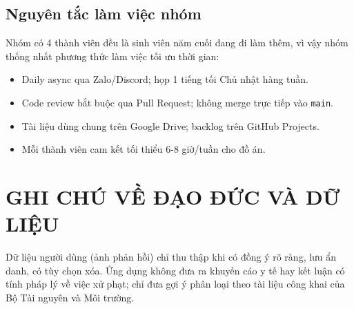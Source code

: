 \documentclass[13pt,a4paper,oneside]{report}
\newcommand{\centerchapter}{%
  \titleformat{\chapter}[hang]{\normalfont\Large\bfseries\centering}{}{0pt}{}%
}
\begin{document}
\section{Nguyên tắc làm việc nhóm}

Nhóm có 4 thành viên đều là sinh viên năm cuối đang đi làm thêm, vì vậy nhóm thống nhất phương thức làm việc tối ưu thời gian:

\begin{itemize}[leftmargin=1.5cm]
    \item Daily async qua Zalo/Discord; họp 1 tiếng tối Chủ nhật hàng tuần.
    \item Code review bắt buộc qua Pull Request; không merge trực tiếp vào \texttt{main}.
    \item Tài liệu dùng chung trên Google Drive; backlog trên GitHub Projects.
    \item Mỗi thành viên cam kết tối thiểu 6-8 giờ/tuần cho đồ án.
\end{itemize}

\centerchapter
\chapter*{GHI CHÚ VỀ ĐẠO ĐỨC VÀ DỮ LIỆU}

Dữ liệu người dùng (ảnh phản hồi) chỉ thu thập khi có đồng ý rõ ràng, lưu ẩn danh, có tùy chọn xóa. Ứng dụng không đưa ra khuyến cáo y tế hay kết luận có tính pháp lý về việc xử phạt; chỉ đưa gợi ý phân loại theo tài liệu công khai của Bộ Tài nguyên và Môi trường.
\end{document}
